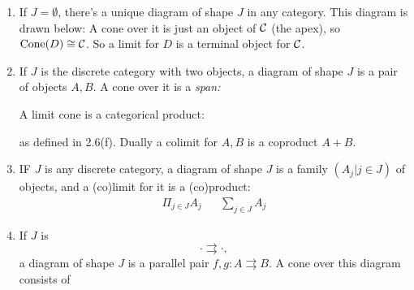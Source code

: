 \documentclass{article}
\begin{document}
\begin{exs}\hspace{0.1cm}
    \begin{enumerate}
        \item[(a)] If $J = \emptyset$, there's a unique diagram of shape $J$ in any category. This diagram is drawn below: \gap \hspace{0.1cm} \gap \hspace{0.1cm} \gap \hspace{0.1cm} \gap \hspace{0.1cm} \gap A cone over it is just an object of $\mathcal{C}$ (the apex), so $\operatorname{Cone}(D) \cong \mathcal{C}$. So a limit for $D$ is a terminal object for $\mathcal{C}$.
        \item[(b)] If $J$ is the discrete category with two objects, a diagram of shape $J$ is a pair of objects $A,B$. A cone over it is a \textit{span:} \begin{center}
        \end{center}
        A limit cone is a categorical product:
        \begin{center}
        \end{center}
        as defined in 2.6(f). Dually a colimit for $A,B$ is a coproduct $A+B$.
        \item[(c)] IF $J$ is any discrete category, a diagram of shape $J$ is a family $(A_{j}| j \in J)$ of objects, and a (co)limit for it is a (co)product: \begin{align*}
            \Pi_{j \in J} A_{j} & & \sum_{j \in J} A_{j}
        \end{align*}
        \item[(d)] If $J$ is \[\cdot \rightrightarrows \cdot,\] a diagram of shape $J$ is a parallel pair $f,g : A \rightrightarrows B$. A cone over this diagram consists of 
        \begin{center}
\end{center}
\end{enumerate}
\end{exs}
\end{document}
